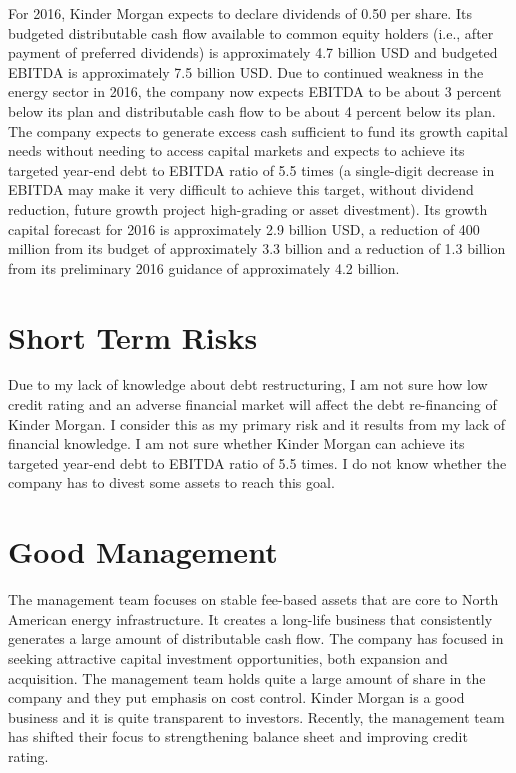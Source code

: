 \documentclass[11pt]{article}
\begin{document}
For 2016, Kinder Morgan expects to declare dividends of 0.50 per share. Its budgeted distributable cash flow available to common equity holders (i.e., after payment of preferred dividends) is approximately 4.7 billion USD and budgeted EBITDA is approximately 7.5 billion USD. Due to continued weakness in the energy sector in 2016, the company now expects EBITDA to be about 3 percent below its plan and distributable cash flow to be about 4 percent below its plan. The company expects to generate excess cash sufficient to fund its growth capital needs without needing to access capital markets and expects to achieve its targeted year-end debt to EBITDA ratio of 5.5 times (a single-digit decrease in EBITDA may make it very difficult to achieve this target, without dividend reduction, future growth project high-grading or asset divestment). Its growth capital forecast for 2016 is approximately 2.9 billion USD, a reduction of 400 million from its budget of approximately 3.3 billion and a reduction of 1.3 billion from its preliminary 2016 guidance of approximately 4.2 billion. 

\section{Short Term Risks}

Due to my lack of knowledge about debt restructuring, I am not sure how low credit rating and an adverse financial market will affect the debt re-financing of Kinder Morgan. I consider this as my primary risk and it results from my lack of financial knowledge. I am not sure whether Kinder Morgan can achieve its targeted year-end debt to EBITDA ratio of 5.5 times. I do not know whether the company has to divest some assets to reach this goal.

\section{Good Management}

The management team focuses on stable fee-based assets that are core to North American energy infrastructure. It creates a long-life business that consistently generates a large amount of distributable cash flow. The company has focused in seeking attractive capital investment opportunities, both expansion and acquisition. The management team holds quite a large amount of share in the company and they put emphasis on cost control. Kinder Morgan is a good business and it is quite transparent to investors. Recently, the management team has shifted their focus to strengthening balance sheet and improving credit rating. 
\end{document}
